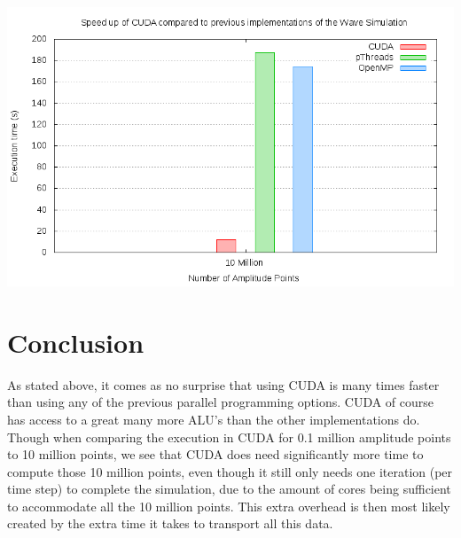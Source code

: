 \documentclass[a4paper,12px]{article}
\begin{document}
\begin{center}
    \includegraphics[width=\textwidth]{speedup10mil}
\end{center}

\section{Conclusion}

As stated above, it comes as no surprise that using CUDA is many times faster
than using any of the previous parallel programming options. CUDA of course has
access to a great many more ALU's than the other implementations do. Though when
comparing the execution in CUDA for 0.1 million amplitude points to 10 million
points, we see that CUDA does need significantly more time to compute those 10
million points, even though it still only needs one iteration (per time step) to
complete the simulation, due to the amount of cores being sufficient to
accommodate all the 10 million points. This extra overhead is then most likely
created by the extra time it takes to transport all this data.



%
%
\end{document}
